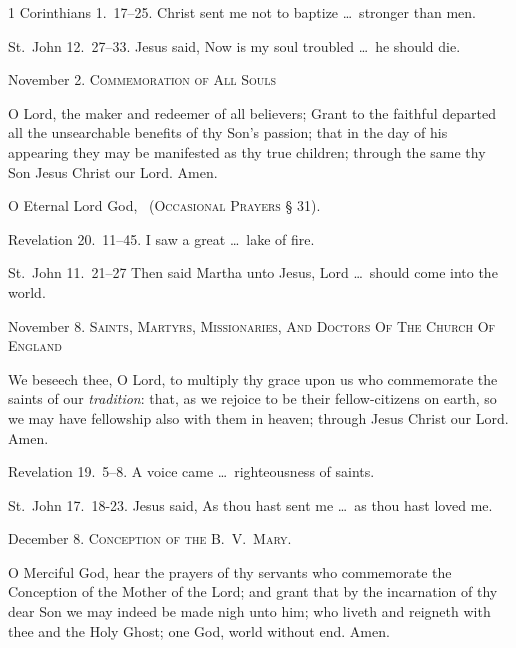  1 Corinthians 1.~17–25.   Christ sent me not to baptize \ldots\ stronger than men.

 St.~John 12.~27–33.   Jesus said, Now is my soul troubled \ldots\ he should die.

\medskip

\noindent November 2. {\scshape Commemoration of All Souls}

 O Lord, the maker and redeemer of all believers; Grant to the faithful departed all the unsearchable benefits of thy Son’s passion; that in the day of his appearing they may be manifested as thy true children; through the same thy Son Jesus Christ our Lord. \R Amen.

 O Eternal Lord God, \etc\ ({\scshape Occasional Prayers} § 31).

 Revelation 20.~11–45.   I saw a great \ldots\ lake of fire.

 St.~John 11.~21–27   Then said Martha unto Jesus, Lord \ldots\ should come into the world.



 
\medskip

\noindent November 8. {\scshape Saints, Martyrs, Missionaries, And Doctors Of The Church Of England}

 We beseech thee, O Lord, to multiply thy grace upon us who commemorate the saints of our \emph{tradition}: that, as we rejoice to be their fellow-citizens on earth, so we may have fellowship also with them in heaven; through Jesus Christ our Lord. \R Amen.

 Revelation 19.~5–8.   A voice came \ldots\ righteousness of saints.

 St.~John 17.~18-23.   Jesus said, As thou hast sent me \ldots\ as thou hast loved me.

\medskip

\noindent December 8. {\scshape Conception of the B.~V.~Mary.}

 O Merciful God, hear the prayers of thy servants who commemorate the Conception of the Mother of the Lord; and grant that by the incarnation of thy dear Son we may indeed be made nigh unto him; who liveth and reigneth with thee and the Holy Ghost; one God, world without end. Amen.

